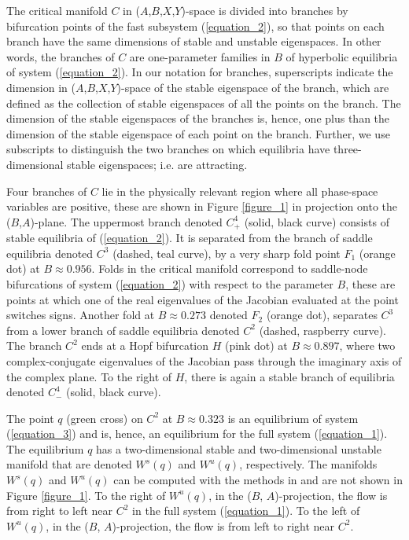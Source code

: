 \documentclass{ws-ijbc}
\begin{document}
The critical manifold $C$ in ($A$,$B$,$X$,$Y$)-space is divided into branches by bifurcation points of the fast subsystem (\ref{equation_2}), so that points on each branch have the same dimensions of stable and unstable eigenspaces.  In other words, the branches of $C$ are one-parameter families in $B$ of hyperbolic equilibria of system (\ref{equation_2}).  In our notation for branches, superscripts indicate the dimension in ($A$,$B$,$X$,$Y$)-space of the stable eigenspace of the branch, which are defined as the collection of stable eigenspaces of all the points on the branch.  The dimension of the stable eigenspaces of the branches is, hence, one plus than the dimension of the stable eigenspace of each point on the branch.  Further, we use subscripts to distinguish the two branches on which equilibria have three-dimensional stable eigenspaces; i.e. are attracting.  

Four branches of $C$ lie in the physically relevant region where all phase-space variables are positive, these are shown in Figure \ref{figure_1} in projection onto the ($B$,$A$)-plane.  The uppermost branch denoted $C^4_+$ (solid, black curve) consists of stable equilibria of (\ref{equation_2}).  It is separated from the branch of saddle equilibria denoted $C^3$ (dashed, teal curve), by a very sharp fold point $F_1$ (orange dot) at $B \approx 0.956$.  Folds in the critical manifold correspond to saddle-node bifurcations of system (\ref{equation_2}) with respect to the parameter $B$, these are points at which one of the real eigenvalues of the Jacobian evaluated at the point switches signs.  Another fold at $B \approx 0.273$ denoted $F_2$ (orange dot), separates $C^3$ from a lower branch of saddle equilibria denoted $C^2$ (dashed, raspberry curve).   The branch $C^2$ ends at a Hopf bifurcation $H$ (pink dot) at $B \approx 0.897$, where two complex-conjugate eigenvalues of the Jacobian pass through the imaginary axis of the complex plane.  To the right of $H$, there is again a stable branch of equilibria denoted $C^4_-$ (solid, black curve).

The point $q$ (green cross) on $C^2$ at $B \approx 0.323$ is an equilibrium of system (\ref{equation_3}) and is, hence, an equilibrium for the full system (\ref{equation_1}).  The equilibrium $q$ has a two-dimensional stable and two-dimensional unstable manifold that are denoted $W^s(q)$ and $W^u(q)$, respectively.  The manifolds $W^{s}(q)$ and $W^{u}(q)$ can be computed with the methods in \cite{Red_book} and are not shown in Figure \ref{figure_1}.  To the right of $W^u(q)$, in the ($B$, $A$)-projection, the flow is from right to left near $C^2$ in the full system (\ref{equation_1}).  To the left of $W^u(q)$, in the ($B$, $A$)-projection, the flow is from left to right near $C^2$.
\end{document}

